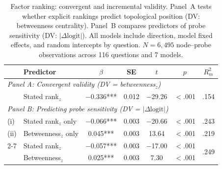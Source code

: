 \begin{table}[t]
\centering
\small
\caption{Factor ranking: convergent and incremental validity. Panel~A tests whether explicit rankings predict topological position (DV: betweenness centrality). Panel~B compares predictors of probe sensitivity (DV: $|\Delta\text{logit}|$). All models include direction, model fixed effects, and random intercepts by question. $N = 6{,}495$ node--probe observations across 116 questions and 7 models.}
\label{tab:factor_ranking}
\begin{tabular}{llccccc}
\toprule
& \textbf{Predictor} & $\beta$ & SE & $t$ & $p$ & $R^2_m$ \\
\midrule
\multicolumn{7}{l}{\textit{Panel A: Convergent validity (DV = betweenness$_z$)}} \\
& Stated rank$_z$ & $-$0.336*** & 0.012 & $-$29.26 & $<$.001 & .154 \\
\midrule
\multicolumn{7}{l}{\textit{Panel B: Predicting probe sensitivity (DV = $|\Delta\text{logit}|$)}} \\
(i) & Stated rank$_z$ only & $-$0.066*** & 0.003 & $-$20.66 & $<$.001 & .243 \\
(ii) & Betweenness$_z$ only & 0.045*** & 0.003 & 13.64 & $<$.001 & .219 \\
\cmidrule{2-7}
\multirow{2}{*}{(iii)} & Stated rank$_z$ & $-$0.057*** & 0.003 & $-$17.00 & $<$.001 & \multirow{2}{*}{.249} \\
& Betweenness$_z$ & 0.025*** & 0.003 & 7.30 & $<$.001 & \\
\bottomrule
\end{tabular}
\end{table}
